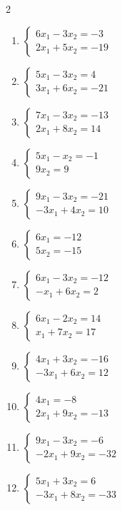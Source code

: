 \begin{multicols}{2}
\begin{enumerate}[label=\arabic*., leftmargin=*]
\item $\begin{cases}6x_1-3x_2=-3\\2x_1+5x_2=-19\end{cases}$
\item $\begin{cases}5x_1-3x_2=4\\3x_1+6x_2=-21\end{cases}$
\item $\begin{cases}7x_1-3x_2=-13\\2x_1+8x_2=14\end{cases}$
\item $\begin{cases}5x_1-x_2=-1\\9x_2=9\end{cases}$
\item $\begin{cases}9x_1-3x_2=-21\\-3x_1+4x_2=10\end{cases}$
\item $\begin{cases}6x_1=-12\\5x_2=-15\end{cases}$
\item $\begin{cases}6x_1-3x_2=-12\\-x_1+6x_2=2\end{cases}$
\item $\begin{cases}6x_1-2x_2=14\\x_1+7x_2=17\end{cases}$
\item $\begin{cases}4x_1+3x_2=-16\\-3x_1+6x_2=12\end{cases}$
\item $\begin{cases}4x_1=-8\\2x_1+9x_2=-13\end{cases}$
\item $\begin{cases}9x_1-3x_2=-6\\-2x_1+9x_2=-32\end{cases}$
\item $\begin{cases}5x_1+3x_2=6\\-3x_1+8x_2=-33\end{cases}$

\end{enumerate}
\end{multicols}
